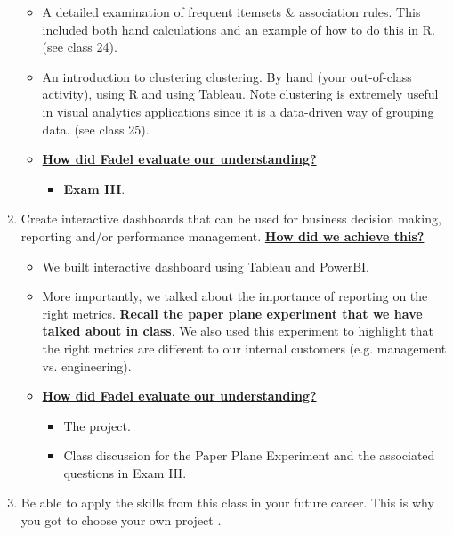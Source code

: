 \documentclass[letterpaper,12pt]{article}
\begin{document}
\begin{enumerate}[label=(\Alph*)]
\begin{itemize}[nosep]
		\item A detailed examination of frequent itemsets \& association rules. This included both hand calculations and an example of how to do this in R. (see class 24).
		\item An introduction to clustering clustering. By hand (your out-of-class activity), using R and using Tableau. Note clustering is extremely useful in visual analytics applications since it is a data-driven way of grouping data. (see class 25).
		\item \textbf{\ul{How did Fadel evaluate our understanding?}}
		\begin{itemize}[nosep]
			\item \textbf{Exam III}.
		\end{itemize}
	\end{itemize}
	\item Create interactive dashboards that can be used for business decision making, reporting and/or performance management.  \textbf{\ul{How did we achieve this?}}
	\begin{itemize}[nosep]
		\item We built interactive dashboard using Tableau and PowerBI. 
		\item More importantly, we talked about the importance of reporting on the right metrics. \textbf{Recall the paper plane experiment that we have talked about in class}. We also used this experiment to highlight that the right metrics are different to our internal customers (e.g. management vs. engineering).
		\item \textbf{\ul{How did Fadel evaluate our understanding?}}
		\begin{itemize}[nosep]
			\item The project.
			\item Class discussion for the Paper Plane Experiment and the associated questions in Exam III.
		\end{itemize}
	\end{itemize}
	\item Be able to apply the skills from this class in your future career. This is why you got to choose your own project \smiley{}.
	
\end{enumerate}
\end{document}
